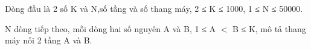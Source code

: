 Dòng đầu là 2 số K và N,số tầng và số thang máy, 2 ≤ K ≤ 1000, 1 ≤ N ≤ 50000.  

   N dòng tiếp theo, mỗi dòng hai số nguyên A và B,  1 ≤ A $<$ B ≤ K, mô tả thang máy nối 2 tầng A và B.